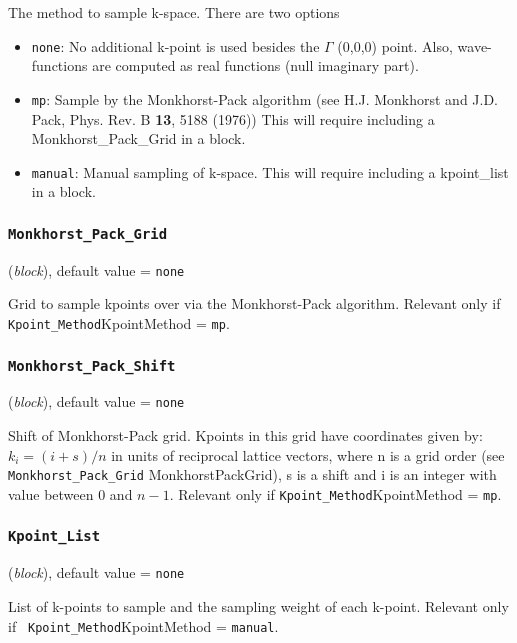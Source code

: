 \documentclass{article}
\begin{document}
The method to sample k-space.  There are two options
\begin{itemize}
\item{\tt none}: No additional k-point is used besides the $\Gamma$
  (0,0,0) point. Also, wave-functions are computed as real functions
  (null imaginary part).

\item{\tt mp}:  Sample by the Monkhorst-Pack algorithm (see
  H.J. Monkhorst and J.D. Pack, Phys. Rev. B {\bf 13}, 5188 (1976))
This will require including a Monkhorst\_Pack\_Grid in a block.

\item{\tt manual}:  Manual sampling of k-space.  This will require
  including a kpoint\_list in a block.

\end{itemize}

\subsubsection{\tt Monkhorst\_Pack\_Grid 
\label{MonkhorstPackGrid}}
({\it block}),
default value = {\tt none }

Grid to sample kpoints over via the Monkhorst-Pack algorithm. Relevant
only if  {\tt Kpoint\_Method}{KpointMethod} = {\tt mp}.

\subsubsection{\tt Monkhorst\_Pack\_Shift 
\label{MonkhorstPackShift}}
({\it block}),
default value = {\tt none }

Shift of Monkhorst-Pack grid. Kpoints in this grid have coordinates
given by: $k_i = ( i + s )/n$ in units of reciprocal lattice vectors,
where n is a grid order (see {\tt Monkhorst\_Pack\_Grid}
{MonkhorstPackGrid}), s is a shift and i is an integer with value
between 0 and $n-1$. Relevant
only if  {\tt Kpoint\_Method}{KpointMethod} = {\tt mp}.

\subsubsection{\tt Kpoint\_List 
\label{KpointList}}
({\it block}),
default value = {\tt none }

List of k-points to sample and the sampling weight of each k-point. Relevant only if {\tt
  Kpoint\_Method}{KpointMethod} = {\tt manual}.
\end{document}
